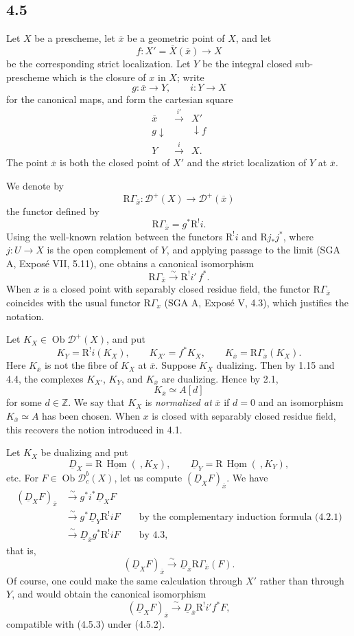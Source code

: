 \documentclass[11pt]{article}
\theoremstyle{plain}
\theoremstyle{definition}
\theoremstyle{remark}
\newcommand{\ZZ}{\mathbb Z}
\newcommand{\D}{\mathcal D}\newcommand{\E}{\mathcal E}\newcommand{\F}{\mathcal F}
\DeclareMathOperator{\Hom}{Hom}
\DeclareMathOperator{\ob}{Ob}
\newcommand{\ol}[1]{\overline{#1}}
\newcommand{\R}{\mathrm R}
\begin{document}
\subsection*{4.5}
Let $X$ be a prescheme, let $\ol x$ be a geometric point of $X$, and let
\[
   f:X'=\ol X(\ol x)\longrightarrow X
\]
be the corresponding strict localization. Let $Y$ be the integral closed sub-prescheme which is the closure of $x$ in $X$; write
\[
   g:\ol x\longrightarrow Y,
   \qquad i:Y\longrightarrow X
\]
for the canonical maps, and form the cartesian square
\[
\begin{array}{ccc}
\ol x&\xrightarrow{i'}&X'\\
\scriptstyle g\downarrow&&\downarrow\scriptstyle f\\
Y&\xrightarrow{i}&X.
\end{array}
\]
The point $\ol x$ is both the closed point of $X'$ and the strict localization of $Y$ at $\ol x$.

We denote by
\[
   \R\Gamma_{\ol x}:\D^+(X)\longrightarrow\D^+(\ol x)
\]
the functor defined by
\[
   \R\Gamma_{\ol x}=g^*\R^!i.\tag{4.5.1}
\]
Using the well-known relation between the functors $\R^!i$ and $\R j_*j^*$, where $j:U\to X$ is the open complement of $Y$, and applying passage to the limit (SGA A, Exposé VII, 5.11), one obtains a canonical isomorphism
\[
   \R\Gamma_{\ol x}\xrightarrow{\sim}\R^!i'\,f^*.\tag{4.5.2}
\]
When $x$ is a closed point with separably closed residue field, the functor $\R\Gamma_{\ol x}$ coincides with the usual functor $\R\Gamma_x$ (SGA A, Exposé V, 4.3), which justifies the notation.

Let $K_X\in\ob\D^+(X)$, and put
\[
   K_Y=\R^!i(K_X),\qquad K_{X'}=f^*K_X,
   \qquad K_{\ol x}=\R\Gamma_{\ol x}(K_X).
\]
Here $K_{\ol x}$ is not the fibre of $K_X$ at $\ol x$. Suppose $K_X$ dualizing. Then by 1.15 and 4.4, the complexes $K_{X'}$, $K_Y$, and $K_{\ol x}$ are dualizing. Hence by 2.1,
\[
   K_{\ol x}\simeq A[d]
\]
for some $d\in\ZZ$. We say that $K_X$ is \emph{normalized at} $\ol x$ if $d=0$ and an isomorphism $K_{\ol x}\simeq A$ has been chosen. When $x$ is closed with separably closed residue field, this recovers the notion introduced in 4.1.

Let $K_X$ be dualizing and put
\[
   \underline D_X=\R\,\underline{\Hom}(\ ,K_X),\qquad
   \underline D_Y=\R\,\underline{\Hom}(\ ,K_Y),
\]
etc. For $F\in\ob\D_c^b(X)$, let us compute $(\underline D_XF)_{\ol x}$. We have
\[
\begin{aligned}
(\underline D_XF)_{\ol x}
&\xrightarrow{\sim}g^*i^*\underline D_XF\\
&\xrightarrow{\sim}g^*\underline D_Y\R^!iF
   \qquad\text{by the complementary induction formula (4.2.1)}\\
&\xrightarrow{\sim}\underline D_{\ol x}g^*\R^!iF
   \qquad\text{by 4.3},
\end{aligned}
\]
that is,
\[
   (\underline D_XF)_{\ol x}
      \xrightarrow{\sim}\underline D_{\ol x}\R\Gamma_{\ol x}(F).\tag{4.5.3}
\]
Of course, one could make the same calculation through $X'$ rather than through $Y$, and would obtain the canonical isomorphism
\[
   (\underline D_XF)_{\ol x}
      \xrightarrow{\sim}\underline D_{\ol x}\R^!i' f^*F,
\]
compatible with (4.5.3) under (4.5.2).
\end{document}
